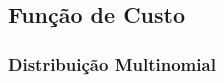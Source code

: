 






\subsection{Função de Custo}
\label{sec:modelo-loss}


\subsubsection{Distribuição Multinomial}
\label{sec:modelo-multi}

